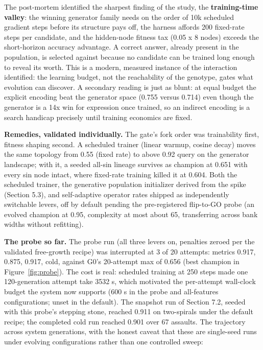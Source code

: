 \documentclass[11pt]{article}
\begin{document}
The post-mortem identified the sharpest finding of the study, the \textbf{training-time valley}: the winning generator family needs on the order of 10k scheduled gradient steps before its structure pays off, the harness affords 200 fixed-rate steps per candidate, and the hidden-node fitness tax (0.05 x 8 nodes) exceeds the short-horizon accuracy advantage. A correct answer, already present in the population, is selected against because no candidate can be trained long enough to reveal its worth. This is a modern, measured instance of the interaction \citet{hinton1987} identified: the learning budget, not the reachability of the genotype, gates what evolution can discover. A secondary reading is just as blunt: at equal budget the explicit encoding beat the generator space (0.755 versus 0.714) even though the generator is a 14x win for expression once trained, so an indirect encoding is a search handicap precisely until training economics are fixed.

\textbf{Remedies, validated individually.} The gate's fork order was trainability first, fitness shaping second. A scheduled trainer (linear warmup, cosine decay) moves the same topology from 0.55 (fixed rate) to above 0.92 query on the generator landscape; with it, a seeded all-sin lineage survives as champion at 0.651 with every sin node intact, where fixed-rate training killed it at 0.604. Both the scheduled trainer, the generative population initializer derived from the spike (Section 5.3), and self-adaptive operator rates shipped as independently switchable levers, off by default pending the pre-registered flip-to-GO probe (an evolved champion at 0.95, complexity at most about 65, transferring across bank widths without refitting).

\textbf{The probe so far.} The probe run (all three levers on, penalties zeroed per the validated free-growth recipe) was interrupted at 3 of 20 attempts: metrics 0.917, 0.875, 0.917, cold, against G0's 20-attempt max of 0.656 (best champion in Figure~\ref{fig:probe}). The cost is real: scheduled training at 250 steps made one 120-generation attempt take 3532 s, which motivated the per-attempt wall-clock budget the system now supports (600 s in the probe and all-features configurations; unset in the default). The snapshot run of Section 7.2, seeded with this probe's stepping stone, reached 0.911 on two-spirals under the default recipe; the completed cold run reached 0.901 over 67 assaults. The trajectory across system generations, with the honest caveat that these are single-seed runs under evolving configurations rather than one controlled sweep:
\end{document}
